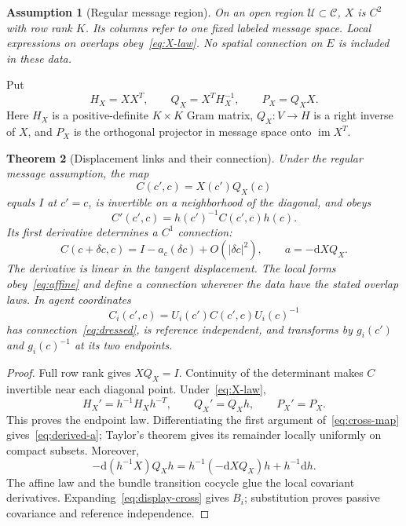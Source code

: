 \documentclass[11pt]{article}
\newtheorem{theorem}{Theorem}
\newtheorem{assumption}[theorem]{Assumption}
\newcommand{\dd}{\mathrm d}
\newcommand{\C}{\mathcal C}
\begin{document}
\begin{assumption}[Regular message region]
On an open region $\mathcal U\subset\C$, $X$ is $C^2$ with row rank $K$. Its columns refer to one fixed labeled message space. Local expressions on overlaps obey~\eqref{eq:X-law}. No spatial connection on $E$ is included in these data.
\end{assumption}

Put
\begin{equation}
 H_X=XX^T,\qquad Q_X=X^T H_X^{-1},\qquad P_X=Q_XX.
 \label{eq:right-inverse}
\end{equation}
Here $H_X$ is a positive-definite $K\times K$ Gram matrix, $Q_X:V\to H$ is a right inverse of $X$, and $P_X$ is the orthogonal projector in message space onto $\operatorname{im}X^T$.

\begin{theorem}[Displacement links and their connection]
Under the regular message assumption, the map
\begin{equation}
 C(c',c)=X(c')Q_X(c)
 \label{eq:cross-map}
\end{equation}
equals $I$ at $c'=c$, is invertible on a neighborhood of the diagonal, and obeys
\begin{equation}
 C'(c',c)=h(c')^{-1}C(c',c)h(c).
 \label{eq:cross-endpoint}
\end{equation}
Its first derivative determines a $C^1$ connection:
\begin{equation}
 C(c+\delta c,c)=I-a_c(\delta c)+O(|\delta c|^2),\qquad
 a=-\dd X Q_X.
 \label{eq:derived-a}
\end{equation}
The derivative is linear in the tangent displacement. The local forms obey~\eqref{eq:affine} and define a connection wherever the data have the stated overlap laws. In agent coordinates
\begin{equation}
 C_i(c',c)=U_i(c')C(c',c)U_i(c)^{-1}
 \label{eq:display-cross}
\end{equation}
has connection~\eqref{eq:dressed}, is reference independent, and transforms by $g_i(c')$ and $g_i(c)^{-1}$ at its two endpoints.
\end{theorem}
\begin{proof}
Full row rank gives $XQ_X=I$. Continuity of the determinant makes $C$ invertible near each diagonal point. Under~\eqref{eq:X-law},
\begin{equation}
 H_X'=h^{-1}H_Xh^{-T},\qquad Q_X'=Q_Xh,\qquad P_X'=P_X.
\end{equation}
This proves the endpoint law. Differentiating the first argument of~\eqref{eq:cross-map} gives~\eqref{eq:derived-a}; Taylor's theorem gives its remainder locally uniformly on compact subsets. Moreover,
\begin{equation}
 -\dd(h^{-1}X)Q_Xh=h^{-1}(-\dd XQ_X)h+h^{-1}\dd h.
\end{equation}
The affine law and the bundle transition cocycle glue the local covariant derivatives. Expanding~\eqref{eq:display-cross} gives $B_i$; substitution proves passive covariance and reference independence.
\end{proof}
\end{document}
